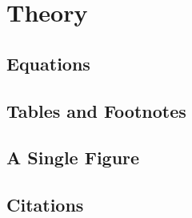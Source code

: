 \chapter{Theory}
\section{Equations}
\section{Tables and Footnotes}
\section{A Single Figure}
\section{Citations}